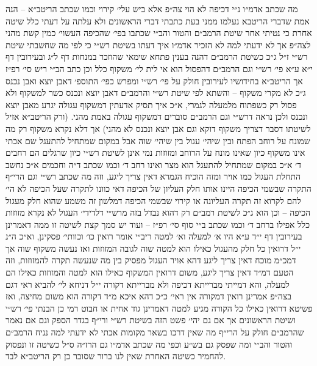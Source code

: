 \documentclass[12pt, openany]{book}
\begin{document}
\begin{multicols}{2}
מה שכתב אדמ״ו נ״י דכיפה לא הוי צה״פ אלא ביש עלי׳ קירוי וכמו שכתב הריטב״א – הנה אמת שדברי הריטבא נעלמו ממני בעת כתבתי דברי הראשונים ולא עלתה על דעתי כלל שיטה אחרת כי נטיתי אחר שיטת הרמב״ם והטור והב״י שכתבו בפי׳ שהכיפה העשוי׳ כמין קשת מהני לצה״פ אך לא ידעתי למה לא הזכיר אדמ״ו איך דעתו בשיטת רש״י כי לפי מה שחשבתי שיטת רש״י ז״ל ג״כ כשיטת הרמב״ם דהנה בענין פתחא שימאי שהוזכר במנחות דף ל״ג ובעירובין דף י״א ע״א פי׳ רש״י וגם הרמב״ם דהפסול הוא אי לית לי׳ משקוף כלל וכן כתב הב״י ריש סי׳ רפ״ז אך הריטב״א בחידושיו לעירובין חולק על פי׳ רש״י ומפרש כפי׳ התוספ׳ דאבן יוצא ואבן נכנס ג״כ לא מקרי משקוף – והשתא לפי שיטת רש״י והרמב״ם דאבן יוצא ונכנס כשר למשקוף ולא פסול רק כשפתוח מלמעלה לגמרי, א״כ איך תסיק אדעתין דמשקוף עגולה יגרע מאבן יוצא ונכנס ולכן נראה דרש״י וגם הרמב״ם סוברים דמשקוף עגולה באמת מהני. (ורק הריטב״א אזיל לשיטתו דסבר דצריך משקוף דוקא וגם אבן יוצא ונכנס לא מהני) אך דלא נקרא משקוף רק מה שמונח על רוחב הפתח ובין שיהי׳ עגול בין שיהי׳ שוה אבל במקום שמתחיל להתעגל שם אכתי אינו משקוף כיון שאינו מונח על הרוחב ומזוזות נמי אינן לשיטת רש״י כיון שרגלים הם רחבים ד׳ א״כ במקום שמתחיל להתעגל הוא מצר ואינו רחב ד׳ וכמו שכתב ד״ה וחכמים א״כ נחשב התחלת העגול כמו אויר ומזה הוכיח הגמרא דאין צריך ליגע, וזה מה שכתב רש״י וגם הרי״ף התקרה שבשמי הכיפה היינו אותו חלק העליון של הכיפה דאי כוונו לתקרה שעל הכיפה לא הי׳ להם לקרוא זה תקרה העליונה או קירוי שבשמי הכיפה דמלשון זה משמע שהוא חלק מעגול הכיפה – וכן הוא ג״כ לשיטת רמב״ם רק דהוא נבדל בזה מרש״י דלדידי׳ העגול לא נקרא מזוזות כלל אפילו ברחב ד׳ וכמו שכתב ב״י סוף סי׳ רפ״ז – ועוד יש סמך קצת לשיטה זו ממה דאמרינן בעירובין דף י״ד ע״א היו א׳ למעלה וא׳ למטה ריב״י אומר רואין כו׳ וכוותי׳ פסקינן, וא״כ ה״נ י״ל דרואין כל חלק מהעגול כאילו הוא למטה שוה לגובה המזוזות ואז נעשה משקוף שוה אך דמכ״מ מוכח דאין צריך ליגע דהא אויר העגול מפסיק בין מה שנעשה תקרה להמזוזות, וזה הטעם דמ״ד דאין צריך ליגע, משום דרואין המשקוף כאילו הוא למטה והמזוזות כאילו הם למעלה, והא דמייתי מברייתא דכיפה ולא מברייתא דקורה י״ל דניחא לי׳ להביא ראי דגם בצה״פ אמרינן רואין דמקורה אין ראי׳ כ״כ דהא איכא מ״ד דקורה הוא משום מחיצה, ואז פשיטא דרואין כאילו כל הקורה מגיע למטה דאמרינן גוד אחית או חבוט רמי כן הבנתי פי׳ רש״י ושיטת הראשונים אך אם גם יהי׳ פשט הזה בשיטת רש״י ורי״ף בגדר הספק וגם אם נאמר שהרמב״ם חולק על הרי״ף מה שאין דרכו בשאר מקומות אכתי לא ידעתי למה נניח הרמב״ם והטור והב״י ומה שפסק גם בש״ע וכפי מה שכתב אדמ״ו גם הרז״ה ס״ל כשיטה זו ונפסוק להחמיר כשיטה האחרת שאין לנו ברור שסובר כן רק הריטב״א לבד.\\\vspace{0pt}


\end{multicols}
\end{document}
